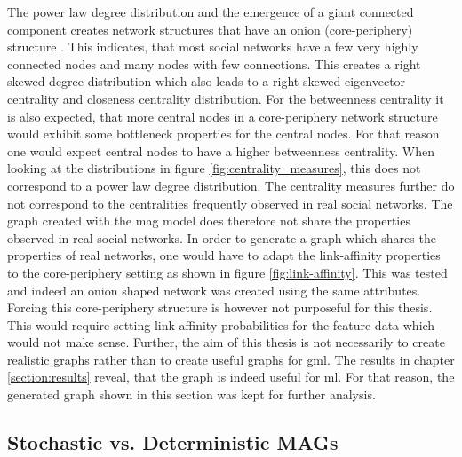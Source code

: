   \noindent The power law degree distribution and the emergence of a giant
  connected component creates network structures that have an onion
  (core-periphery) structure \citep[p. 121]{kim2012multiplicative}. This
  indicates, that most social networks have a few very highly connected nodes
  and many nodes with few connections. This creates a right skewed degree 
  distribution which also leads to a right skewed eigenvector centrality and
  closeness centrality distribution. For the betweenness centrality it is 
  also expected, that more central nodes in a core-periphery network structure
  would exhibit some bottleneck properties for the central nodes. For that
  reason one would expect central nodes to have a higher betweenness centrality.
  When looking at the distributions in figure \ref{fig:centrality_measures},
  this does not correspond to a power law degree distribution. The centrality 
  measures further do not correspond to the centralities frequently observed in 
  real social networks. The graph created with the \acs{mag} model does therefore 
  not share the properties observed in real social networks. In order to 
  generate a graph which shares the properties of real networks, one would have 
  to adapt the link-affinity properties to the core-periphery setting as shown 
  in figure \ref{fig:link-affinity}. This was tested and indeed an onion shaped
  network was created using the same attributes. Forcing this core-periphery 
  structure is however not purposeful for this thesis. This would require
  setting link-affinity probabilities for the feature data which would not make
  sense. Further, the aim of this thesis is not necessarily to create realistic 
  graphs rather than to create useful graphs for \acs{gml}. The results in 
  chapter \ref{section:results} reveal, that the graph is indeed useful for
  \acs{ml}. For that reason, the generated graph shown in this section was kept 
  for further analysis. 

  \subsection{Stochastic vs. Deterministic MAGs}
  \label{section:stoch_det}

